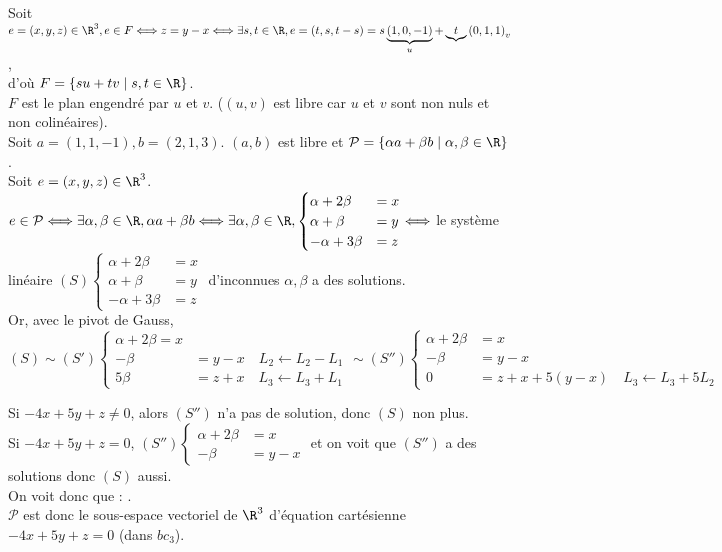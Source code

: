 \documentclass[12pt, a4paper]{report}
\begin{document}
\begin{remarque}{}
Soit $e = (x,y,z) \in \R^3, e \in F \Longleftrightarrow z = y-x \Longleftrightarrow \exists s,t \in \R, e = (t,s,t-s) = s\underbrace{(1,0,-1)}_{u} + \underbrace t{(0,1,1)}_{v}$, \\
d'où $F = \{ su+tv \mid s,t \in \R \}$. \\
$F$ est le plan engendré par $u$ et $v$. ($(u,v)$ est libre car $u$ et $v$ sont non nuls et non colinéaires). \\


Soit $a = (1,1,-1), b=(2,1,3)$. $(a,b)$ est libre et $\mathcal{P} = \{ \alpha a + \beta b \mid \alpha, \beta \in \R \}$. \\
Soit $e = (x,y,z) \in \R^3$. \\
$e \in \mathcal{P} \Longleftrightarrow \exists \alpha, \beta \in \R, \alpha a + \beta b  \\
\Longleftrightarrow \exists \alpha, \beta \in \R, 
\begin{cases}
\alpha + 2\beta &= x \\
\alpha + \beta &= y \\
-\alpha + 3\beta &= z
\end{cases}
\Longleftrightarrow$ le système linéaire $(S)
\begin{cases}
\alpha + 2\beta &= x \\
\alpha + \beta &= y \\
-\alpha + 3\beta &= z
\end{cases}$ d'inconnues $\alpha,\beta$ a des solutions. \\

Or, avec le pivot de Gauss, $(S) \sim (S') 
\begin{cases}
\alpha + 2\beta = x \\
 - \beta &= y-x \quad L_2 \leftarrow L_2 - L_1 \\
 5\beta &= z+x  \quad L_3 \leftarrow L_3+L_1
\end{cases}
\sim (S'')
\begin{cases}
\alpha  + 2\beta &= x \\
 -\beta &= y-x \\
0 &=  z+x + 5(y-x) \quad L_3 \leftarrow L_3 + 5L_2
\end{cases}$

Si $-4x + 5y + z \ne 0$, alors $(S'')$ n'a pas de solution, donc $(S)$ non plus. \\
Si $-4x+5y+z = 0$, $(S'')
\begin{cases}
\alpha +  2\beta &= x \\
 -\beta &= y-x
\end{cases}$
et on voit que $(S'')$ a des solutions donc $(S)$ aussi. \\
On voit donc que : . \\
$\mathcal{P}$ est donc le sous-espace vectoriel de $\R^3$ d'équation cartésienne $-4x + 5y + z = 0$ (dans $bc_3$).
\end{remarque}
\end{document}
